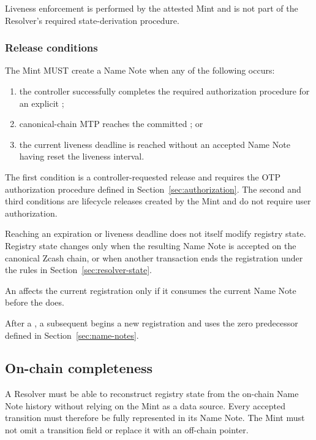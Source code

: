 Liveness enforcement is performed by the attested Mint and is not part of the Resolver's required state-derivation procedure.

\subsubsection{Release conditions}

The Mint MUST create a  Name Note when any of the following occurs:

\begin{enumerate}
  \item the controller successfully completes the required authorization procedure for an explicit ;
  \item canonical-chain MTP reaches the committed ; or
  \item the current liveness deadline is reached without an accepted Name Note having reset the liveness interval.
\end{enumerate}

The first condition is a controller-requested release and requires the OTP authorization procedure defined in Section~\ref{sec:authorization}. The second and third conditions are lifecycle releases created by the Mint and do not require user authorization.

Reaching an expiration or liveness deadline does not itself modify registry state. Registry state changes only when the resulting  Name Note is accepted on the canonical Zcash chain, or when another transaction ends the registration under the rules in Section~\ref{sec:resolver-state}.

An  affects the current registration only if it consumes the current Name Note before the  does.

After a , a subsequent  begins a new registration and uses the zero predecessor defined in Section~\ref{sec:name-notes}.

\subsection{On-chain completeness}

A Resolver must be able to reconstruct registry state from the on-chain Name Note history without relying on the Mint as a data source. Every accepted transition must therefore be fully represented in its Name Note. The Mint must not omit a transition field or replace it with an off-chain pointer.

